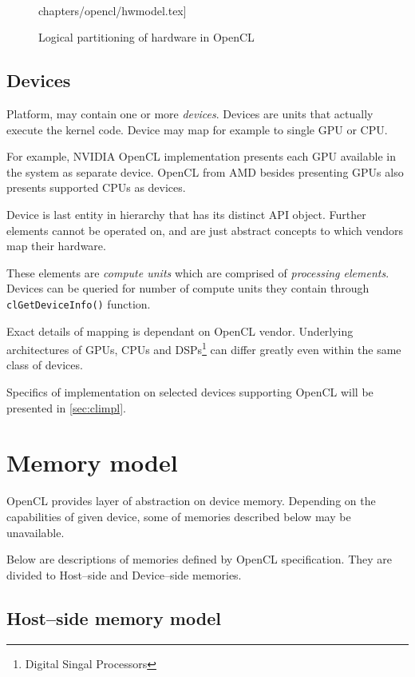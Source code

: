 \begin{figure}[hb]
	\begin{center}
	  \\{chapters/opencl/hwmodel.tex]}
	\end{center}
	\caption{Logical partitioning of hardware in OpenCL}
	\label{fig:clhw}
\end{figure}

\subsection{Devices}

Platform, may contain one or more \emph{devices}. Devices are units that
actually execute the kernel code. Device may map for example to single GPU or
CPU.

For example, NVIDIA OpenCL implementation presents each GPU available in the
system as separate device. OpenCL from AMD besides presenting GPUs also presents
supported CPUs as devices.

Device is last entity in hierarchy that has its distinct API object. Further
elements cannot be operated on, and are just abstract concepts to which vendors
map their hardware.

These elements are \emph{compute units} which are comprised of \emph{processing
elements}. Devices can be queried for number of compute units they contain
through \texttt{clGetDeviceInfo()} function.


Exact details of mapping is dependant on OpenCL vendor. Underlying architectures
of GPUs, CPUs and DSPs\footnote{Digital Singal Processors} can differ greatly
even within the same class of devices.

Specifics of implementation on selected devices supporting OpenCL will be
presented in \autoref{sec:climpl}.

\section{Memory model}

OpenCL provides layer of abstraction on device memory. Depending on the
capabilities of given device, some of memories described below may be
unavailable.

Below are descriptions of memories defined by OpenCL specification. They are
divided to Host--side and Device--side memories.


\subsection{Host--side memory model}


